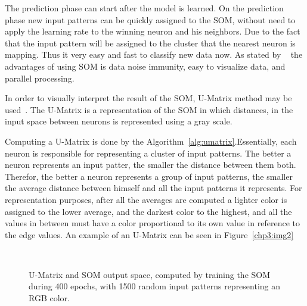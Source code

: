 The prediction phase can start after the model is learned. On the prediction phase new input patterns can be quickly assigned to the \ac{SOM}, without need to apply the learning rate to the winning neuron and his neighbors. Due to the fact that the input pattern will be assigned to the cluster that the nearest neuron is mapping. Thus it very easy and fast to classify new data now. As stated by ~\citet{Liu2012b} the advantages of using \ac{SOM} is data noise immunity, easy to visualize data, and parallel processing.

In order to visually interpret the result of the \ac{SOM}, \ac{U-Matrix} method may be used~\citep{Bacao2005}. The \ac{U-Matrix} is a representation of the \ac{SOM} in which distances, in the input space between neurons is represented using a gray scale.

Computing a U-Matrix is done by the Algorithm~\ref{alg:umatrix}.Essentially, each neuron is responsible for representing a cluster of input patterns. The better a neuron represents an input patter, the smaller the distance between them both. Therefor, the better a neuron represents a group of input patterns, the smaller the average distance between himself and all the input patterns it represents. 
For representation purposes, after all the averages are computed a lighter color is assigned to the lower average, and the darkest color to the highest, and all the values in between must have a color proportional to its own value in reference to the edge values. An example of an \ac{U-Matrix} can be seen in Figure~\ref{chp3:img2} 

\begin{figure}[htpb]
  \centering
  \hspace*{0.5cm}
  \\
  \caption{U-Matrix and SOM output space, computed by training the SOM during 400 epochs, with 1500 random input patterns representing an RGB color.}
  \label{fig:umatrix_and_ouputspace}
\end{figure}


 
